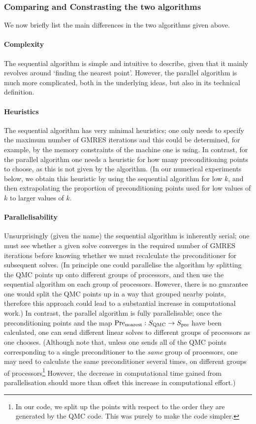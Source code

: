 \subsubsection{Comparing and Constrasting the two algorithms}

We now briefly list the main differences in the two algorithms given above.

\paragraph{Complexity} The sequential algorithm is simple and intuitive to describe, given that it mainly revolves around `finding the nearest point'. However, the parallel algorithm is much more complicated, both in the underlying ideas, but also in its technical definition.

\paragraph{Heuristics} The sequential algorithm has very minimal heuristics; one only needs to specify the maximum number of GMRES iterations and this could be determined, for example, by the memory constraints of the machine one is using. In contrast, for the parallel algorithm one needs a heuristic for how many preconditioning points to choose, as this is not given by the algorithm. (In our numerical experiments below, we obtain this heuristic by using the sequential algorithm for low $k$, and then extrapolating the proportion of preconditioning points used for low values of $k$ to larger values of $k.$

\paragraph{Parallelisability} Unsurprisingly (given the name) the sequential algorithm is inherently serial; one must see whether a given solve converges in the required number of GMRES iterations before knowing whether we must recalculate the preconditioner for subsequent solves. (In principle one could parallelise the algorithm by splitting the QMC points up onto different groups of processors, and then use the sequential algorithm on each group of processors. However, there is no guarantee one would split the QMC points up in a way that grouped nearby points, therefore this approach could lead to a substantial increase in computational work.) In contrast, the parallel algorithm is fully parallelisable; once the preconditioning points and the map $\mathrm{Pre}_{\mathrm{nearest}}:S_{\mathrm{QMC}}\rightarrow S_{\mathrm{pre}}$ have been calculated, one can send different linear solves to different groups of processors as one chooses. (Although note that, unless one sends all of the QMC points corresponding to a single preconditioner to the \emph{same} group of processors, one may need to calculate the same preconditioner several times, on different groups of processors\footnote{In our code, we split up the points with respect to the order they are generated by the QMC code. This was purely to make the code simpler.} However, the decrease in computational time gained from parallelisation should more than offset this increase in computational effort.)

